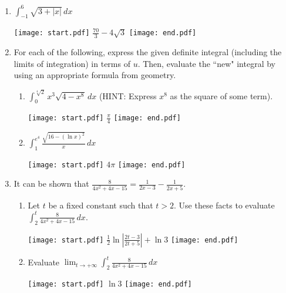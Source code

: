 \documentclass[12pt]{article}
\begin{document}
\begin{enumerate}
\item $\int_{-1}^6 \sqrt{3+|x|} \,dx$

\texttt{[image: start.pdf]}
{{$\frac{70}{3}-4\sqrt{3}$}}
\texttt{[image: end.pdf]}


\item For each of the following, express the given definite integral (including the limits of integration) in terms of $u$.  Then, evaluate the ``new" integral by using an appropriate formula from geometry.

\begin{enumerate}

\item $\int_0^{\sqrt[4]{2}} x^3\sqrt{4-x^8} \,dx$ (HINT: Express $x^8$ as the square of some term).

\texttt{[image: start.pdf]}
{{$\frac{\pi}{4}$}}
\texttt{[image: end.pdf]}


\item $\int_1^{e^4} \frac{\sqrt{16-(\ln{x})^2}}{x} \,dx$

\texttt{[image: start.pdf]}
{{$4\pi$}}
\texttt{[image: end.pdf]}


\end{enumerate}

\item It can be shown that $\frac{8}{4x^2+4x-15}=\frac{1}{2x-3}-\frac{1}{2x+5}$.

\begin{enumerate}

\item Let $t$ be a fixed constant such that $t>2$.  Use these facts to evaluate $\int_2^t \frac{8}{4x^2+4x-15} \,dx$.

\texttt{[image: start.pdf]}
{{$\frac{1}{2}\ln{\left|\frac{2t-3}{2t+5}\right|}+\ln{3}$}}
\texttt{[image: end.pdf]}


\item Evaluate $\lim_{t \rightarrow +\infty} \int_2^t \frac{8}{4x^2+4x-15} \,dx$

\texttt{[image: start.pdf]}
{{$\ln{3}$}}
\texttt{[image: end.pdf]}


\end{enumerate}

\end{enumerate}
\end{document}
